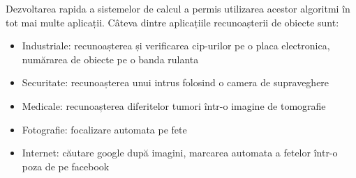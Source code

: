 \pagebreak

Dezvoltarea rapida a sistemelor de calcul a permis utilizarea acestor algoritmi în tot mai multe aplicații. Câteva dintre aplicațiile recunoașterii de obiecte sunt:
\begin{itemize}
	\item Industriale: recunoașterea și verificarea cip-urilor pe o placa electronica, numărarea de obiecte pe o banda rulanta
	\item Securitate: recunoașterea unui intrus folosind o camera de supraveghere
	\item Medicale: recunoașterea diferitelor tumori într-o imagine de tomografie
	\item Fotografie: focalizare automata pe fete
	\item Internet: căutare google după imagini, marcarea automata a fetelor într-o poza de pe facebook
\end{itemize}



















